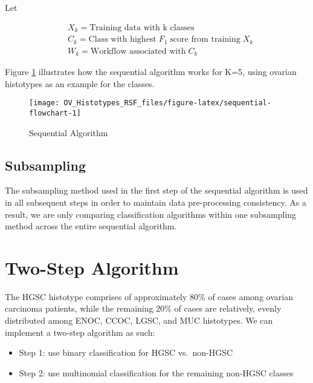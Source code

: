 \documentclass[
]{report}
\providecommand{\tightlist}{%
  \setlength{\itemsep}{0pt}\setlength{\parskip}{0pt}}
\begin{document}
Let

\[
\begin{aligned}
& X_k = \text{Training data with k classes}  \\
& C_k = \text{Class with highest}\;F_1\;\text{score from training}\;X_k \\
& W_k = \text{Workflow associated with}\;C_k
\end{aligned}
\label{eq:sequential}
\]

Figure \ref{fig:sequential-flowchart} illustrates how the sequential algorithm works for K=5, using ovarian histotypes as an example for the classes.

\begin{figure}[H]

{\centering \texttt{[image: OV\_Histotypes\_RSF\_files/figure-latex/sequential-flowchart-1]} 

}

\caption{Sequential Algorithm}\label{fig:sequential-flowchart}
\end{figure}

\hypertarget{subsampling-1}{%
\subsection{Subsampling}\label{subsampling-1}}

The subsampling method used in the first step of the sequential algorithm is used in all subsequent steps in order to maintain data pre-processing consistency. As a result, we are only comparing classification algorithms within one subsampling method across the entire sequential algorithm.

\hypertarget{two-step-algorithm}{%
\section{Two-Step Algorithm}\label{two-step-algorithm}}

The HGSC histotype comprises of approximately 80\% of cases among ovarian carcinoma patients, while the remaining 20\% of cases are relatively, evenly distributed among ENOC, CCOC, LGSC, and MUC histotypes. We can implement a two-step algorithm as such:

\begin{itemize}
\tightlist
\item
  Step 1: use binary classification for HGSC vs.~non-HGSC
\item
  Step 2: use multinomial classification for the remaining non-HGSC classes
\end{itemize}
\end{document}
